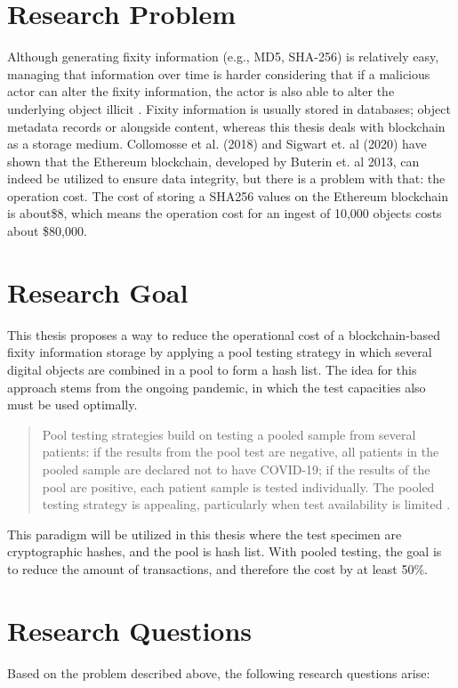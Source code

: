 \section{Research Problem}
Although generating fixity information (e.g., MD5, SHA-256) is relatively easy, managing that information over time is harder considering that if a malicious actor can alter the fixity information, the actor is also able to alter the underlying object illicit \cite[35]{kirschenbaum2010digital}. Fixity information is usually stored in databases; object metadata records or alongside content, whereas this thesis deals with blockchain as a storage medium. Collomosse et al. (2018) and Sigwart et. al (2020) have shown that the Ethereum blockchain, developed by Buterin et. al 2013, can indeed be utilized to ensure data integrity, but there is a problem with that: the operation cost. The cost of storing a SHA256 values on the Ethereum blockchain is about\$8, which means the operation cost for an ingest of 10,000 objects costs about \$80,000.

\section{Research Goal}
This thesis proposes a way to reduce the operational cost of a blockchain-based fixity information storage by applying a pool testing strategy in which several digital objects are combined in a pool to form a hash list. The idea for this approach stems from the ongoing pandemic, in which the test capacities also must be used optimally.
\begin{quote}
Pool testing strategies build on testing a pooled sample from several patients: if the results from the pool test are negative, all patients in the pooled sample are declared not to have COVID-19; if the results of the pool are positive, each patient sample is tested individually. The pooled testing strategy is appealing, particularly when test availability is limited \cite[1]{cherif2020simulation}.
\end{quote}
This paradigm will be utilized in this thesis where the test specimen are cryptographic hashes, and the pool is hash list. With pooled testing, the goal is to reduce the amount of transactions, and therefore the cost by at least 50\%.

\section{Research Questions}
Based on the problem described above, the following research questions arise:

